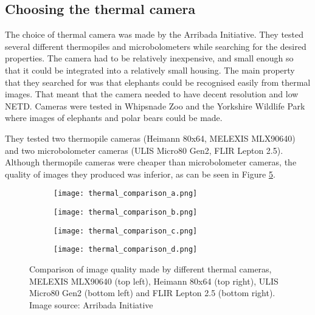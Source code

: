 \subsection{ Choosing the thermal camera} \label{choosing_thermal}

The choice of thermal camera was made by the Arribada Initiative\cite{thermal_comparison}.
They tested several different thermopiles and microbolometers while searching for the desired properties.
The camera had to be relatively inexpensive, and small enough so that it could be integrated into a relatively small housing.
The main property that they searched for was that elephants could be recognised easily from thermal images.
That meant that the camera needed to have decent resolution and low NETD.
Cameras were tested in Whipsnade Zoo and the Yorkshire Wildlife Park where images of elephants and polar bears could be made.

They tested two thermopile cameras (Heimann 80x64, MELEXIS MLX90640) and two microbolometer cameras (ULIS Micro80 Gen2, FLIR Lepton 2.5).
Although thermopile cameras were cheaper than microbolometer cameras, the quality of images they produced was inferior, as can be seen in Figure \ref{thermal_comparison_images}.
\newline
\begin{figure}[ht]
    \begin{subfigure}{0.5\textwidth}
        \centering
        \texttt{[image: thermal\_comparison\_a.png]} 
        \label{thermal_comparison_a}
    \end{subfigure}
    \begin{subfigure}{0.5\textwidth}
        \centering
        \texttt{[image: thermal\_comparison\_b.png]} 
        \label{thermal_comparison_b}
    \end{subfigure}
    \begin{subfigure}{0.5\textwidth}
        \centering
        \texttt{[image: thermal\_comparison\_c.png]} 
        \label{thermal_comparison_c}
    \end{subfigure}
    \begin{subfigure}{0.5\textwidth}
        \centering
        \texttt{[image: thermal\_comparison\_d.png]} 
        \label{thermal_comparison_d}
    \end{subfigure}
\caption[Comparison of image quality made by different thermal cameras.]{Comparison of image quality made by different thermal cameras, MELEXIS MLX90640 (top left), Heimann 80x64 (top right), ULIS Micro80 Gen2 (bottom left) and FLIR Lepton 2.5 (bottom right). Image source: Arribada Initiative \cite{thermal_comparison}}
    \label{thermal_comparison_images}
\end{figure}

